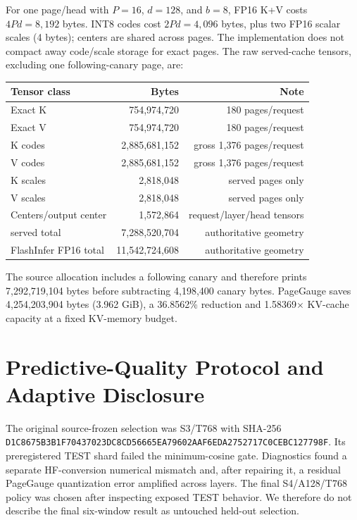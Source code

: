 For one page/head with $P=16$, $d=128$, and $b=8$, FP16 K+V costs
$4Pd=8,192$ bytes. INT8 codes cost $2Pd=4,096$ bytes, plus two FP16 scalar
scales (4 bytes); centers are shared across pages. The implementation does not
compact away code/scale storage for exact pages. The raw served-cache tensors,
excluding one following-canary page, are:
\begin{center}
\begin{tabular}{lrr}
\toprule
Tensor class & Bytes & Note \\
\midrule
Exact K & 754,974,720 & 180 pages/request \\
Exact V & 754,974,720 & 180 pages/request \\
K codes & 2,885,681,152 & gross 1,376 pages/request \\
V codes & 2,885,681,152 & gross 1,376 pages/request \\
K scales & 2,818,048 & served pages only \\
V scales & 2,818,048 & served pages only \\
Centers/output center & 1,572,864 & request/layer/head tensors \\
\midrule
\method{} served total & 7,288,520,704 & authoritative geometry \\
FlashInfer FP16 total & 11,542,724,608 & authoritative geometry \\
\bottomrule
\end{tabular}
\end{center}
The source allocation includes a following canary and therefore prints
7,292,719,104 bytes before subtracting 4,198,400 canary bytes. PageGauge saves
4,254,203,904 bytes (3.962 GiB), a 36.8562\% reduction
and 1.58369$\times$ KV-cache capacity at a fixed KV-memory budget.

\section{Predictive-Quality Protocol and Adaptive Disclosure}

The original source-frozen selection was S3/T768 with SHA-256
\texttt{D1C8675B3B1F70437023DC8CD56665EA79602AAF6EDA2752717C0CEBC127798F}.
Its preregistered TEST shard failed the minimum-cosine gate. Diagnostics found a
separate HF-conversion numerical mismatch and, after repairing it, a residual
PageGauge quantization error amplified across layers. The final S4/A128/T768
policy was chosen after inspecting exposed TEST behavior. We therefore do not
describe the final six-window result as untouched held-out selection.

